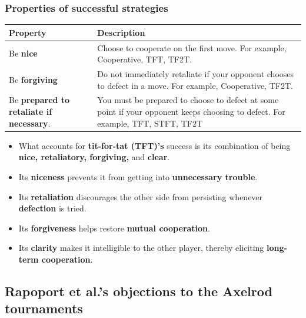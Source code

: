 \documentclass[11pt]{article}
\begin{document}
\subsubsection{Properties of successful strategies}
\label{sec:org85cdee2}
\begin{center}
\begin{tabular}{|m{8em}|m{22em}|}
\hline
Property & Description\\
\hline
Be \textbf{nice} & Choose to cooperate on the first move. For example, Cooperative, TFT, TF2T.\\
\hline
Be \textbf{forgiving} & Do not immediately retaliate if your opponent chooses to defect in a move. For example, Cooperative, TF2T.\\
\hline
Be \textbf{prepared to retaliate if necessary}. & You must be prepared to choose to defect at some point if your opponent keeps choosing to defect. For example, TFT, STFT, TF2T\\
\hline
\end{tabular}
\end{center}
\begin{itemize}
\item What accounts for \textbf{tit-for-tat (TFT)'s} success is its combination of being \textbf{nice, retaliatory, forgiving,} and \textbf{clear}.
\item Its \textbf{niceness} prevents it from getting into \textbf{unnecessary trouble}.
\item Its \textbf{retaliation} discourages the other side from persisting whenever \textbf{defection} is tried.
\item Its \textbf{forgiveness} helps restore \textbf{mutual cooperation}.
\item Its \textbf{clarity} makes it intelligible to the other player, thereby eliciting \textbf{long-term cooperation}.
\end{itemize}

 \newpage
\subsection{Rapoport et al.'s objections to the Axelrod tournaments}
\label{sec:org75be497}
\end{document}
